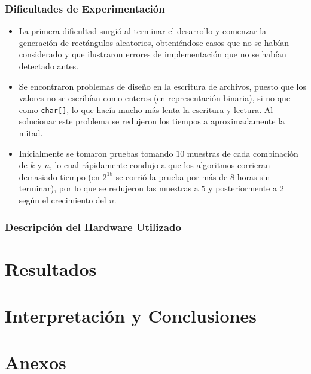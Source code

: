 \documentclass[12pt,spanish]{article}
\begin{document}
\subsubsection{Dificultades de Experimentaci\'on}

\begin{itemize}
	\item La primera dificultad surgi\'o al terminar el desarrollo y comenzar la generaci\'on de rect\'angulos aleatorios, obteni\'endose casos que no se hab\'ian considerado y que ilustraron errores de implementaci\'on que no se hab\'ian detectado antes.
	\item Se encontraron problemas de dise\~no en la escritura de archivos, puesto que los valores no se escrib\'ian como enteros (en representaci\'on binaria), si no que como \texttt{char[]}, lo que hac\'ia mucho m\'as lenta la escritura y lectura. Al solucionar este problema se redujeron los tiempos a aproximadamente la mitad.
	\item Inicialmente se tomaron pruebas tomando $10$ muestras de cada combinaci\'on de $k$ y $n$, lo cual r\'apidamente condujo a que los algoritmos corrieran demasiado tiempo (en $2^{18}$ se corri\'o la prueba por m\'as de 8 horas sin terminar), por lo que se redujeron las muestras a $5$ y posteriormente a $2$ seg\'un el crecimiento del $n$.
\end{itemize}

\subsubsection{Descripci\'on del Hardware Utilizado}
\section{Resultados}

\section{Interpretaci\'on y Conclusiones}

\section{Anexos}
\end{document}
